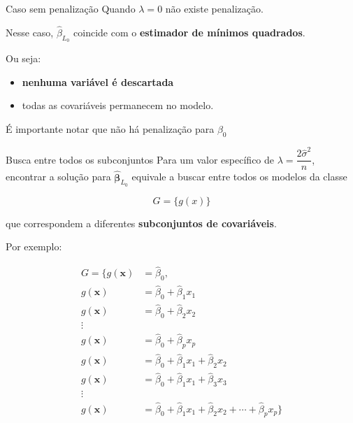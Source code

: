 \documentclass[
  ignorenonframetext,
  aspectratio=169,
]{beamer}
\providecommand{\tightlist}{%
  \setlength{\itemsep}{0pt}\setlength{\parskip}{0pt}}
\begin{document}
\begin{frame}
\begin{block}{Caso sem penalização}
\label{caso-sem-penalizauxe7uxe3o}
Quando \(\lambda = 0\) não existe penalização.

Nesse caso, \(\hat{\beta}_{L_0}\) coincide com o \textbf{estimador de
mínimos quadrados}.

Ou seja:

\begin{itemize}
\tightlist
\item
  \textbf{nenhuma variável é descartada}
\item
  todas as covariáveis permanecem no modelo.
\end{itemize}

{É importante notar que não há penalização para \(\beta_0\)}
\end{block}
\end{frame}

\begin{frame}
\begin{block}{Busca entre todos os subconjuntos}
\label{busca-entre-todos-os-subconjuntos}
Para um valor específico de \(\lambda = \dfrac{2 \hat{\sigma}^2}{n}\),
encontrar a solução para \(\hat{\boldsymbol{\beta}}_{L_0}\) equivale a
buscar entre todos os modelos da classe

\[
G =
\{g(x)\}
\]

que correspondem a diferentes \textbf{subconjuntos de covariáveis}.
\end{block}
\end{frame}

\begin{frame}
Por exemplo:

\[
\begin{aligned}
G = \{g(\mathbf{x})&=\hat{\beta}_0,\\
g(\mathbf{x}) &=\hat{\beta}_0+\hat{\beta}_1 x_1\\
g(\mathbf{x}) &=\hat{\beta}_0+\hat{\beta}_2 x_2 \\
\vdots\\
g(\mathbf{x}) &=\hat{\beta}_0+\hat{\beta}_p x_p \\
g(\mathbf{x}) &=\hat{\beta}_0+\hat{\beta}_1 x_1+\hat{\beta}_2 x_2\\
g(\mathbf{x}) &=\hat{\beta}_0+\hat{\beta}_1 x_1+\hat{\beta}_3 x_3\\
\vdots\\
g(\mathbf{x}) &=\hat{\beta}_0+\hat{\beta}_1 x_1+\hat{\beta}_2 x_2+\cdots+\hat{\beta}_p x_p\}
\end{aligned}
\]
\end{frame}
\end{document}
